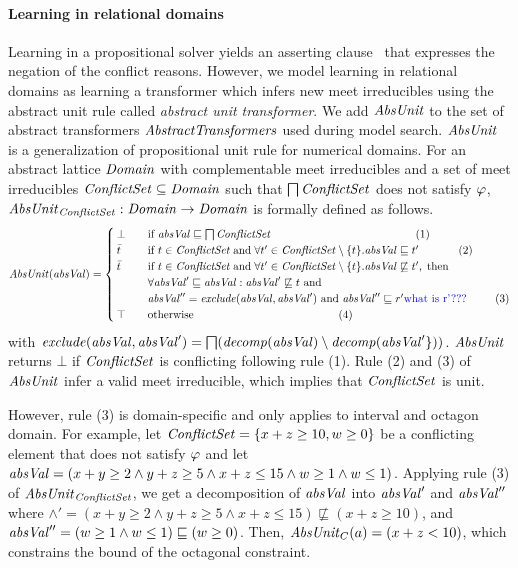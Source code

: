 \paragraph{\textbf{Learning in relational domains}}
Learning in a propositional solver yields an asserting
clause~\cite{cdcl} that expresses the negation of the conflict
reasons.  However, we model learning in relational domains as learning
a transformer which infers new meet irreducibles using the abstract
unit rule called {\em abstract unit transformer}.  We add $\mathit{AbsUnit}$ to
the set of abstract transformers $\mathit{AbstractTransformers}$ used during model
search. $\mathit{AbsUnit}$ is a generalization of propositional unit rule for
numerical domains.  For an abstract lattice $\mathit{Domain}$ with
complementable meet irreducibles and a set of meet irreducibles $\mathit{ConflictSet}
\subseteq \mathit{Domain}$ such that $\bigsqcap
\mathit{ConflictSet}$ does not satisfy $\varphi$, $\mathit{AbsUnit}_{\mathit{ConflictSet}}: \mathit{Domain} \rightarrow
\mathit{Domain}$ is formally defined as follows.
\[ \mathit{AbsUnit}(\mathit{absVal}) =
 \begin{cases}
  \bot       & \quad \text{if } \mathit{absVal} \sqsubseteq \bigsqcap \mathit{ConflictSet} \qquad \qquad \qquad
  \qquad \qquad \qquad \quad (1)\\
  \bar{t}    & \quad \text{if } t \in \mathit{ConflictSet} \; \text{and} \; \forall t' \in \mathit{ConflictSet}
  \setminus \{t\}. \mathit{absVal}  \sqsubseteq t' \qquad \quad \; \; (2) \\
  \bar{t}    & \quad \text{if } t \in \mathit{ConflictSet} \; \text{and} \; \forall t' \in \mathit{ConflictSet} \setminus \{t\}. \mathit{absVal}
  \not\sqsubseteq t', \; \text{then} \\ 
             & \quad \forall \mathit{absVal}' \sqsubseteq \mathit{absVal}: \mathit{absVal}'
             \not\sqsubseteq t \text{ and}\\ 
             & \quad \mathit{absVal}''=\mathit{exclude}(\mathit{absVal},\mathit{absVal}') \text{ and }\mathit{absVal}''\sqsubseteq r' {\color{blue}{\text{what is r'???}}} \qquad  \; \; (3) \\
  \top & \quad \text{otherwise} \qquad \qquad \qquad \qquad \qquad \qquad \quad (4) \\
 \end{cases}
\]
with $\mathit{exclude}(\mathit{absVal},\mathit{absVal}')=\bigsqcap({\mathit{decomp}}(\mathit{absVal}) \setminus
{\mathit{decomp}}(\mathit{absVal}'\}))$.  $\mathit{AbsUnit}$ returns $\bot$ if $\mathit{ConflictSet}$ is
conflicting following rule (1).  Rule (2) and (3) of $\mathit{AbsUnit}$ infer a
valid meet irreducible, which implies that $\mathit{ConflictSet}$ is unit.

However, rule (3) is domain-specific  and only applies to interval and
octagon  domain.  For example, let $\mathit{ConflictSet} =
\{ x+z \geq 10, w \geq 0 \}$ be a conflicting element  that does not satisfy $\varphi$ and let $\mathit{absVal}= (x+y
\geq 2\wedge y+z \geq 5\wedge x+z \leq 15\wedge w \geq 1\wedge w \leq
1)$.  Applying rule (3) of $\mathit{AbsUnit}_{\mathit{ConflictSet}}$, we get a
decomposition of $\mathit{absVal}$ into $\mathit{absVal}'$ and $\mathit{absVal}''$ where
$\wedge'= (x+y \geq 2\wedge y+z \geq 5\wedge x+z \leq 15)
\not\sqsubseteq (x+z \geq 10)$, and $\mathit{absVal}''= (w \geq 1\wedge w \leq
1) \sqsubseteq (w \geq 0)$.  Then, $\mathit{AbsUnit}_C(a) = (x+z < 10)$, which
constrains the bound of the octagonal constraint.

